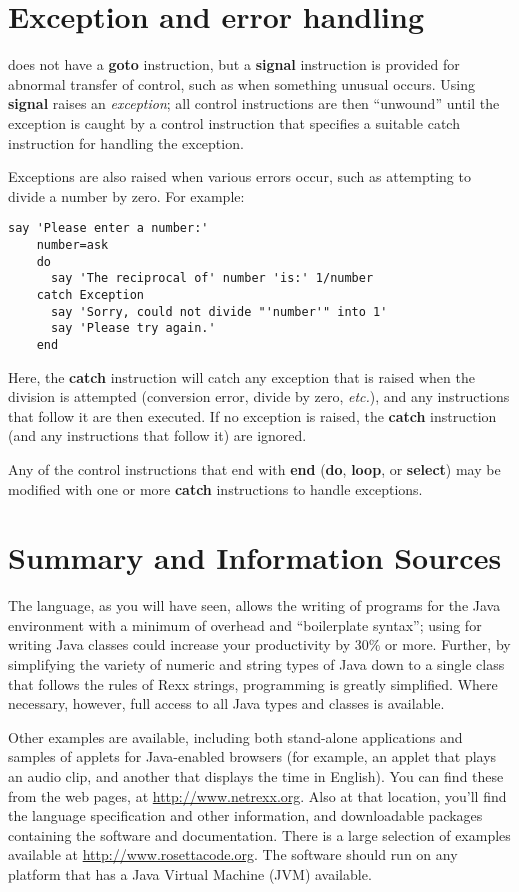 \section{Exception and error handling}\label{exceptions}
\nr{} does not have a \textbf{goto} instruction, but a \textbf{signal} instruction is provided for abnormal transfer of control, such as when something unusual occurs. Using \textbf{signal} raises an \emph{exception}; all control instructions are then “unwound” until the exception is caught by a control instruction that specifies a suitable catch instruction for handling the exception.

Exceptions are also raised when various errors occur, such as
attempting to divide a number by zero. For example:
\begin{lstlisting}[label=exception,caption=Exception]
    say 'Please enter a number:'
    number=ask
    do
      say 'The reciprocal of' number 'is:' 1/number
    catch Exception
      say 'Sorry, could not divide "'number'" into 1'
      say 'Please try again.'
    end
\end{lstlisting}
Here, the \textbf{catch} instruction will catch any exception that is raised when the division is attempted (conversion error, divide by zero, \emph{etc.}), and any instructions that follow it are then executed. If no exception is raised, the \textbf{catch} instruction (and any instructions that follow it) are ignored.

Any of the control instructions that end with \textbf{end} (\textbf{do}, \textbf{loop}, or \textbf{select}) may be modified with one or more \textbf{catch} instructions to handle exceptions.

\section{Summary and Information Sources}
The \nr{} language, as you will have seen, allows the writing of programs for the Java environment with a minimum of overhead and “boilerplate syntax”; using \nr{} for writing Java classes could increase your productivity by 30\% or more.
Further, by simplifying the variety of numeric and string types of
Java down to a single class that follows the rules of Rexx strings,
programming is greatly simplified. Where necessary, however, full
access to all Java types and classes is available.

Other examples are available, including both stand-alone applications and samples of applets for Java-enabled browsers (for example, an applet that plays an audio clip, and another that displays the time in English). You can find these from the \nr{} web pages, at
    \url{http://www.netrexx.org}.
Also at that location, you’ll find the \nr{} language specification
and other information, and downloadable packages containing the
\nr{} software and documentation. There is a large selection of
\nr{} examples available at \url{http://www.rosettacode.org}.
The software should run on any platform that has a Java Virtual
Machine (JVM) available.